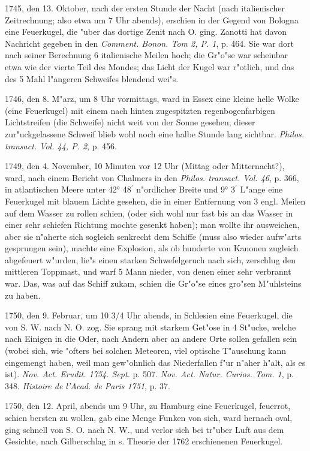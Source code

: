 \documentclass[a4paper, 11pt, oneside, polutonikogreek, german]{article}
\begin{document}
1745, den 13. Oktober, nach der ersten Stunde der Nacht (nach italienischer Zeitrechnung; also etwa um 7 Uhr abends), erschien in der Gegend von Bologna eine Feuerkugel, die "uber das dortige Zenit nach O. ging. Zanotti hat davon Nachricht gegeben in den \emph{Comment. Bonon. Tom 2, P. 1}, p. 464. Sie war dort nach seiner Berechnung 6 italienische Meilen hoch; die Gr"o"se war scheinbar etwa wie der vierte Teil des Mondes; das Licht der Kugel war r"otlich, und das des 5 Mahl l"angeren Schweifes blendend wei"s.

1746, den 8. M"arz, um 8 Uhr vormittags, ward in Essex eine kleine helle Wolke (eine Feuerkugel) mit einem nach hinten zugespitzten regenbogenfarbigen Lichtstreifen (die Schweife) nicht weit von der Sonne gesehen; dieser zur"uckgelassene Schweif blieb wohl noch eine halbe Stunde lang sichtbar. \emph{Philos. transact. Vol. 44, P. 2}, p. 456.

1749, den 4. November, 10 Minuten vor 12 Uhr (Mittag oder Mitternacht?), ward, nach einem Bericht von Chalmers in den \emph{Philos. transact. Vol. 46}, p. 366, in atlantischen Meere unter 42° 48$^{\prime}$ n"ordlicher Breite und 9° 3$^{\prime}$ L"ange eine Feuerkugel mit blauem Lichte gesehen, die in einer Entfernung von 3 engl. Meilen auf dem Wasser zu rollen schien, (oder sich wohl nur fast bis an das Wasser in einer sehr schiefen Richtung mochte gesenkt haben); man wollte ihr ausweichen, aber sie n"aherte sich sogleich senkrecht dem Schiffe (muss also wieder aufw"arts gesprungen sein), machte eine Explosion, als ob hunderte von Kanonen zugleich abgefeuert w"urden, lie"s einen starken Schwefelgeruch nach sich, zerschlug den mittleren Toppmast, und warf 5 Mann nieder, von denen einer sehr verbrannt war. Das, was auf das Schiff zukam, schien die Gr"o"se eines gro"sen M"uhlsteins zu haben.

1750, den 9. Februar, um 10 3/4 Uhr abends, in Schlesien eine Feuerkugel, die von S. W. nach N. O. zog. Sie sprang mit starkem Get"ose in 4 St"ucke, welche nach Einigen in die Oder, nach Andern aber an andere Orte sollen gefallen sein (wobei sich, wie "ofters bei solchen Meteoren, viel optische T"auschung kann eingemengt haben, weil man gew"ohnlich das Niederfallen f"ur n"aher h"alt, als es ist). \emph{Nov. Act. Erudit. 1754. Sept.} p. 507. \emph{Nov. Act. Natur. Curios. Tom. 1}, p. 348. \emph{Histoire de l'Acad. de Paris 1751}, p. 37.

1750, den 12. April, abends um 9 Uhr, zu Hamburg eine Feuerkugel, feuerrot, schien bersten zu wollen, gab eine Menge Funken von sich, ward hernach oval, ging schnell von S. O. nach N. W., und verlor sich bei tr"uber Luft aus dem Gesichte, nach Gilberschlag in s. Theorie der 1762 erschienenen Feuerkugel.
\end{document}
